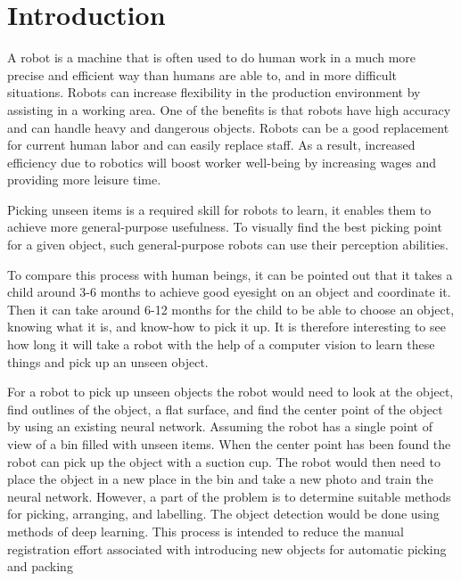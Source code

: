 \chapter{Introduction\label{cha:introduction}}

A robot is a machine that is often used to do human work in a much more precise and efficient way than humans are able to, and in more difficult situations. Robots can increase flexibility in the production environment by assisting in a working area. One of the benefits is that robots have high accuracy and can handle heavy and dangerous objects. Robots can be a good replacement for current human labor and can easily replace staff. As a result, increased efficiency due to robotics will boost worker well-being by increasing wages and providing more leisure time.

Picking unseen items is a required skill for robots to learn, it enables them to achieve more general-purpose usefulness. To visually find the best picking point for a given object, such general-purpose robots can use their perception abilities.

To compare this process with human beings, it can be pointed out that it takes a child around 3-6 months to achieve good eyesight on an object and coordinate it. Then it can take around 6-12 months for the child to be able to choose an object, knowing what it is, and know-how to pick it up. It is therefore interesting to see how long it will take a robot with the help of a computer vision to learn these things and pick up an unseen object. 

For a robot to pick up unseen objects\cite{xie_unseen_2021} the robot would need to look at the object, find outlines of the object, a flat surface, and find the center point of the object by using an existing neural network. Assuming the robot has a single point of view of a bin filled with unseen items. When the center point has been found the robot can pick up the object with a suction cup. The robot would then need to place the object in a new place in the bin and take a new photo and train the neural network. However, a part of the problem is to determine suitable methods for picking, arranging, and labelling. The object detection would be done using methods of deep learning. This process is intended to reduce the manual registration effort associated with introducing new objects for automatic picking and packing


